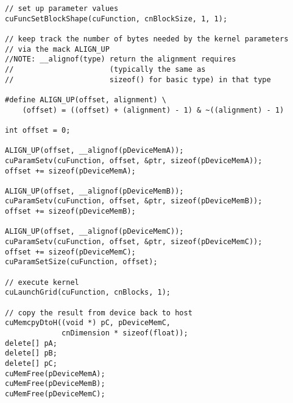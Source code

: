 \begin{lstlisting}
// set up parameter values
cuFuncSetBlockShape(cuFunction, cnBlockSize, 1, 1);

// keep track the number of bytes needed by the kernel parameters
// via the mack ALIGN_UP
//NOTE: __alignof(type) return the alignment requires 
//                      (typically the same as
//                      sizeof() for basic type) in that type

#define ALIGN_UP(offset, alignment) \ 
    (offset) = ((offset) + (alignment) - 1) & ~((alignment) - 1)
    
int offset = 0;

ALIGN_UP(offset, __alignof(pDeviceMemA));
cuParamSetv(cuFunction, offset, &ptr, sizeof(pDeviceMemA));
offset += sizeof(pDeviceMemA);

ALIGN_UP(offset, __alignof(pDeviceMemB));
cuParamSetv(cuFunction, offset, &ptr, sizeof(pDeviceMemB));
offset += sizeof(pDeviceMemB);

ALIGN_UP(offset, __alignof(pDeviceMemC));
cuParamSetv(cuFunction, offset, &ptr, sizeof(pDeviceMemC));
offset += sizeof(pDeviceMemC);
cuParamSetSize(cuFunction, offset);
    
// execute kernel
cuLaunchGrid(cuFunction, cnBlocks, 1);

// copy the result from device back to host
cuMemcpyDtoH((void *) pC, pDeviceMemC, 
             cnDimension * sizeof(float));
delete[] pA;
delete[] pB;
delete[] pC;
cuMemFree(pDeviceMemA);
cuMemFree(pDeviceMemB);
cuMemFree(pDeviceMemC);
\end{lstlisting}

